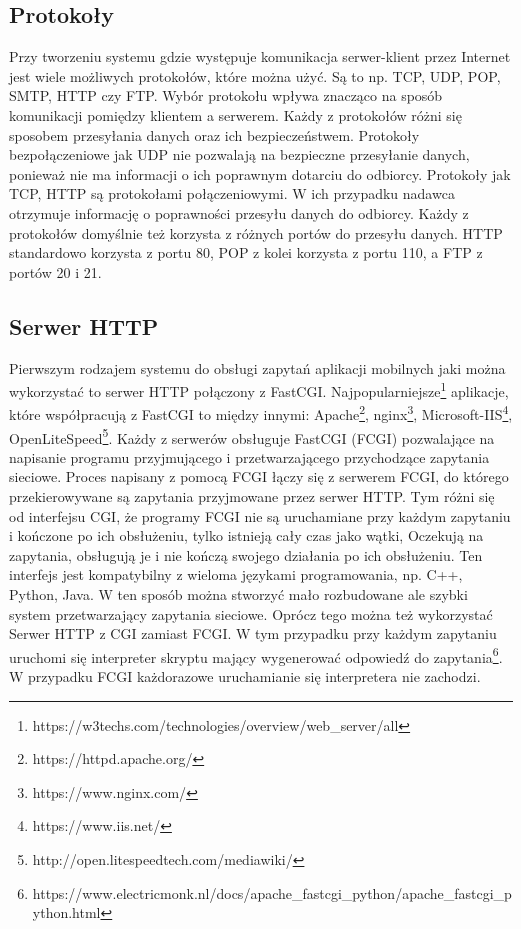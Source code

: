 \documentclass[eng]{mgr}
\begin{document}
			\subsection{Protokoły}
			Przy tworzeniu systemu gdzie występuje komunikacja serwer-klient przez Internet jest wiele możliwych protokołów, które można użyć. Są to np. TCP, UDP, POP, SMTP, HTTP czy FTP. Wybór protokołu wpływa znacząco na sposób komunikacji pomiędzy klientem a serwerem. Każdy z protokołów różni się sposobem przesyłania danych oraz ich bezpieczeństwem. Protokoły bezpołączeniowe jak UDP nie pozwalają na bezpieczne przesyłanie danych, ponieważ nie ma informacji o ich poprawnym dotarciu do odbiorcy. Protokoły jak TCP, HTTP są protokołami połączeniowymi. W ich przypadku nadawca otrzymuje informację o poprawności przesyłu danych do odbiorcy. Każdy z protokołów domyślnie też korzysta z różnych portów do przesyłu danych. HTTP standardowo korzysta z portu 80, POP z kolei korzysta z portu 110, a FTP z portów 20 i 21.
	
			\subsection{Serwer HTTP}
			Pierwszym rodzajem systemu do obsługi zapytań aplikacji mobilnych jaki można wykorzystać to serwer HTTP połączony z FastCGI. Najpopularniejsze\footnote{https://w3techs.com/technologies/overview/web\_server/all} aplikacje, które współpracują z FastCGI to między innymi: Apache\footnote{https://httpd.apache.org/}, nginx\footnote{https://www.nginx.com/}, Microsoft-IIS\footnote{https://www.iis.net/}, OpenLiteSpeed\footnote{http://open.litespeedtech.com/mediawiki/}. Każdy z serwerów obsługuje FastCGI (FCGI) pozwalające na napisanie programu przyjmującego i przetwarzającego przychodzące zapytania sieciowe. Proces napisany z pomocą FCGI łączy się z serwerem FCGI, do którego przekierowywane są zapytania przyjmowane przez serwer HTTP. Tym różni się od interfejsu CGI, że programy FCGI nie są uruchamiane przy każdym zapytaniu i kończone po ich obsłużeniu, tylko istnieją cały czas jako wątki, Oczekują na zapytania, obsługują je i nie kończą swojego działania po ich obsłużeniu. Ten interfejs jest kompatybilny z wieloma językami programowania, np. C++, Python, Java. W ten sposób można stworzyć mało rozbudowane ale szybki system przetwarzający zapytania sieciowe.
			Oprócz tego można też wykorzystać Serwer HTTP z CGI zamiast FCGI. W tym przypadku przy każdym zapytaniu uruchomi się interpreter skryptu mający wygenerować odpowiedź do zapytania\footnote{https://www.electricmonk.nl/docs/apache\_fastcgi\_python/apache\_fastcgi\_python.html}. W przypadku FCGI każdorazowe uruchamianie się interpretera nie zachodzi.
			
\end{document}
